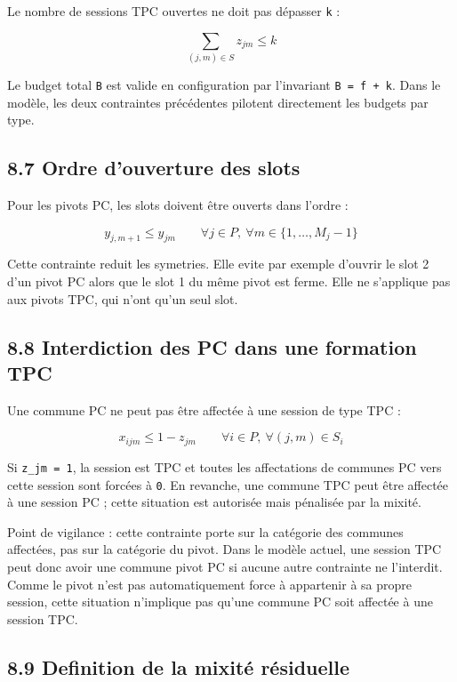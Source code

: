 \documentclass[11pt,a4paper]{article}
\begin{document}
Le nombre de sessions TPC ouvertes ne doit pas dépasser \texttt{k} :

\[
\sum_{(j,m)\in S} z_{jm} \leq k
\]

Le budget total \texttt{B} est valide en configuration par l'invariant \texttt{B = f + k}. Dans le modèle, les deux contraintes précédentes pilotent directement les budgets par type.

\subsection{8.7 Ordre d'ouverture des slots}

Pour les pivots PC, les slots doivent être ouverts dans l'ordre :

\[
y_{j,m+1} \leq y_{jm}
\qquad
\forall j \in P,\ \forall m \in \{1,\dots,M_j-1\}
\]

Cette contrainte reduit les symetries. Elle evite par exemple d'ouvrir le slot 2 d'un pivot PC alors que le slot 1 du même pivot est ferme. Elle ne s'applique pas aux pivots TPC, qui n'ont qu'un seul slot.

\subsection{8.8 Interdiction des PC dans une formation TPC}

Une commune PC ne peut pas être affectée à une session de type TPC :

\[
x_{ijm} \leq 1-z_{jm}
\qquad
\forall i \in P,\ \forall (j,m)\in S_i
\]

Si \texttt{z\_jm = 1}, la session est TPC et toutes les affectations de communes PC vers cette session sont forcées à \texttt{0}. En revanche, une commune TPC peut être affectée à une session PC ; cette situation est autorisée mais pénalisée par la mixité.

Point de vigilance : cette contrainte porte sur la catégorie des communes affectées, pas sur la catégorie du pivot. Dans le modèle actuel, une session TPC peut donc avoir une commune pivot PC si aucune autre contrainte ne l'interdit. Comme le pivot n'est pas automatiquement force à appartenir à sa propre session, cette situation n'implique pas qu'une commune PC soit affectée à une session TPC.

\subsection{8.9 Definition de la mixité résiduelle}
\end{document}
